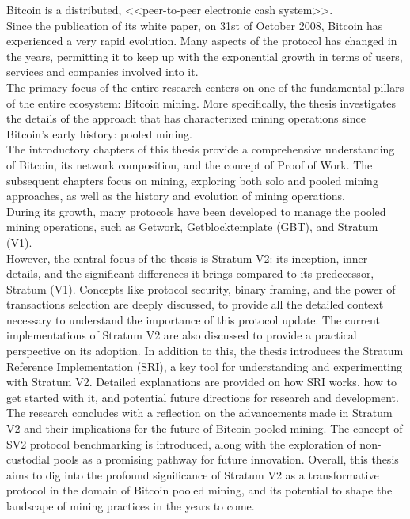 Bitcoin is a distributed, <<peer-to-peer electronic cash system>>\cite{nakamoto2008bitcoin}.\\
Since the publication of its white paper, on 31st of October 2008, Bitcoin has experienced a very rapid evolution. Many aspects of the protocol has changed in the years, permitting it to keep up with the exponential growth in terms of users, services and companies involved into it.\\
The primary focus of the entire research centers on one of the fundamental pillars of the entire ecosystem: Bitcoin mining.
More specifically, the thesis investigates the details of the approach that has characterized mining operations since Bitcoin's early history: pooled mining.\\
The introductory chapters of this thesis provide a comprehensive understanding of Bitcoin, its network composition, and the concept of Proof of Work. The subsequent chapters focus on mining, exploring both solo and pooled mining approaches, as well as the history and evolution of mining operations.\\
During its growth, many protocols have been developed to manage the pooled mining operations, such as Getwork, Getblocktemplate (GBT), and Stratum (V1).\\ 
However, the central focus of the thesis is Stratum V2: its inception, inner details, and the significant differences it brings compared to its predecessor, Stratum (V1). Concepts like protocol security, binary framing, and the power of transactions selection are deeply discussed, to provide all the detailed context necessary to understand the importance of this protocol update.
The current implementations of Stratum V2 are also discussed to provide a practical perspective on its adoption.
In addition to this, the thesis introduces the Stratum Reference Implementation (SRI), a key tool for understanding and experimenting with Stratum V2. Detailed explanations are provided on how SRI works, how to get started with it, and potential future directions for research and development.\\
The research concludes with a reflection on the advancements made in Stratum V2 and their implications for the future of Bitcoin pooled mining. The concept of SV2 protocol benchmarking is introduced, along with the exploration of non-custodial pools as a promising pathway for future innovation.
Overall, this thesis aims to dig into the profound significance of Stratum V2 as a transformative protocol in the domain of Bitcoin pooled mining, and its potential to shape the landscape of mining practices in the years to come.